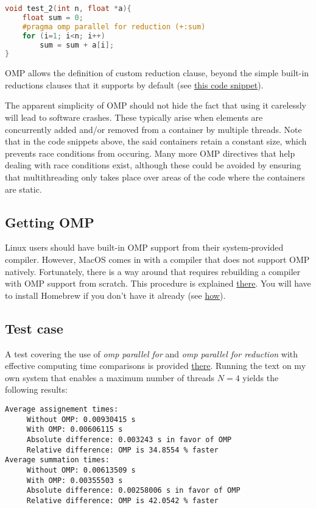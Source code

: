 \begin{lstlisting}[language=C++]
void test_2(int n, float *a){
	float sum = 0;
	#pragma omp parallel for reduction (+:sum)
 	for (i=1; i<n; i++)
 		sum = sum + a[i];
}
\end{lstlisting}

OMP allows the definition of custom reduction clause, beyond the simple built-in reductions clauses that it supports by default (see \href{https://gist.github.com/eruffaldi/7180bdec4c8c9a11f019dd0ba9a2d68c}{this code snippet}).

The apparent simplicity of OMP should not hide the fact that using it carelessly will lead to software crashes. These typically arise when elements are concurrently added and/or removed from a container by multiple threads. Note that in the code snippets above, the said containers retain a constant size, which prevents race conditions from occuring. Many more OMP directives that help dealing with race conditions exist, although these could be avoided by ensuring that multithreading only takes place over areas of the code where the containers are static.

\subsection{Getting OMP}
Linux users should have built-in OMP support from their system-provided compiler. However, MacOS comes in with a compiler that does not support OMP natively. Fortunately, there is a way around that requires rebuilding a compiler with OMP support from scratch. This procedure is explained \href{https://github.com/bbercovici/SBGAT/wiki/2)-Compile-and-install-SBGAT-dependencies#build-gcc-from-source-mac-users-only}{there}. You will have to install Homebrew if you don't have it already (see \href{https://github.com/bbercovici/SBGAT/wiki/2)-Compile-and-install-SBGAT-dependencies#homebrew-mac-users-only}{how}).

\subsection{Test case}
A test covering the use of \textit{omp parallel for} and \textit{omp parallel for reduction} with effective computing time comparisons is provided \href{https://github.com/bbercovici/openMP_demo}{there}. Running the text on my own system that enables a maximum number of threads $N = 4$ yields the following results:

\begin{lstlisting}[language = {}]
Average assignement times: 
	 Without OMP: 0.00930415 s
	 With OMP: 0.00606115 s
	 Absolute difference: 0.003243 s in favor of OMP
	 Relative difference: OMP is 34.8554 % faster
Average summation times: 
	 Without OMP: 0.00613509 s
	 With OMP: 0.00355503 s
	 Absolute difference: 0.00258006 s in favor of OMP
	 Relative difference: OMP is 42.0542 % faster
\end{lstlisting}

